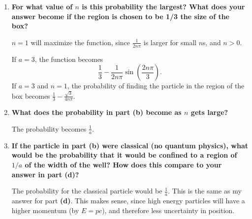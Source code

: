 \documentclass[11pt]{article}
\begin{document}
\begin{enumerate}[label=\textbf{\arabic*.}, start=5]
{\begin{enumerate}[label=\textbf{(\alph*)}]
{\begin{align*}
                    \end{align*}
                }
                \item{
                    \textbf{\boldmath For what value of \(n\) is this probability the largest? What does your answer become if the region is chosen to be 1/3 the size of the box?}
                    \par
                    \(n=1\) will maximize the function, since \(\frac{1}{2n\pi}\) is larger for small \(n\)s, and \(n>0\).
                    \par
                    If \(a=3\), the function becomes \[\frac{1}{3}-\frac{1}{2n\pi}\sin\left(\frac{2n\pi}{3}\right).\]
                    If \(a=3\) and \(n=1\), the probability of finding the particle in the region of the box becomes \(\frac{1}{3}-\frac{\sqrt 3}{4n\pi}\).
                }
                \item{
                    \textbf{\boldmath What does the probability in part \textbf{(b)} become as \(n\) gets large?}
                    \par
                    The probability becomes \(\frac{1}{a}\).
                }
                \item{
                    \textbf{\boldmath If the particle in part \textbf{(b)} were classical (no quantum physics), what would be the probability that it would be confined to a region of \(1/a\) of the width of the well? How does this compare to your answer in part \textbf{(d)}?}
                    \par
                    The probability for the classical particle would be \(\frac{1}{a}\). This is the same as my answer for part \textbf{(d)}. This makes sense, since high energy particles will have a higher momentum (by \(E=pc\)), and therefore less uncertainty in position.
                }
            \end{enumerate}
        }
    \end{enumerate}
\end{document}
